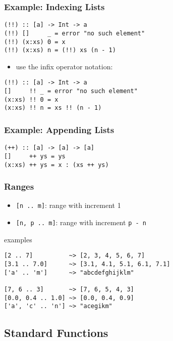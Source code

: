 \documentclass[dvipsnames]{beamer}
\theoremstyle{plain}
\begin{document}
\begin{frame}[fragile]
  \frametitle{Example: Indexing Lists}

  \begin{lstlisting}
(!!) :: [a] -> Int -> a
(!!) []     _ = error "no such element"
(!!) (x:xs) 0 = x
(!!) (x:xs) n = (!!) xs (n - 1)
  \end{lstlisting}

  \pause
  \begin{itemize}
    \item use the infix operator notation:
  \end{itemize}

  \begin{lstlisting}
(!!) :: [a] -> Int -> a
[]     !! _ = error "no such element"
(x:xs) !! 0 = x
(x:xs) !! n = xs !! (n - 1)
  \end{lstlisting}
\end{frame}

\begin{frame}[fragile]
  \frametitle{Example: Appending Lists}

  \begin{lstlisting}
(++) :: [a] -> [a] -> [a]
[]     ++ ys = ys
(x:xs) ++ ys = x : (xs ++ ys)
  \end{lstlisting}
\end{frame}

\begin{frame}[fragile]
  \frametitle{Ranges}

  \begin{itemize}
    \item \lstinline|[n .. m]|: range with increment 1
    \item \lstinline|[n, p .. m]|: range with increment \texttt{p - n}
  \end{itemize}

  \begin{exampleblock}{examples}
    \begin{lstlisting}
[2 .. 7]          ~> [2, 3, 4, 5, 6, 7]
[3.1 .. 7.0]      ~> [3.1, 4.1, 5.1, 6.1, 7.1]
['a' .. 'm']      ~> "abcdefghijklm"

[7, 6 .. 3]       ~> [7, 6, 5, 4, 3]
[0.0, 0.4 .. 1.0] ~> [0.0, 0.4, 0.9]
['a', 'c' .. 'n'] ~> "acegikm"
    \end{lstlisting}
  \end{exampleblock}
\end{frame}

\subsection{Standard Functions}
\end{document}
